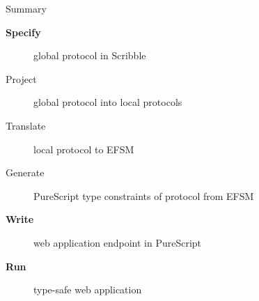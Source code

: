 \documentclass[aspectratio=1610]{beamer}
\begin{document}
\begin{frame}{Summary}
  \begin{description}
    \item [\bf Specify] \textcolor{gprot}{global protocol} in Scribble
    \item [Project] \textcolor{gprot}{global protocol} into \textcolor{lprot}{local protocols}
    \item [Translate] \textcolor{lprot}{local protocol} to \textcolor{efsm}{EFSM}
    \item [Generate] PureScript type constraints of protocol from \textcolor{efsm}{EFSM}
    \item [\bf Write] \textcolor{proc}{web application} endpoint in PureScript
    \item [\bf Run] type-safe web application
  \end{description}
\end{frame}
\end{document}
